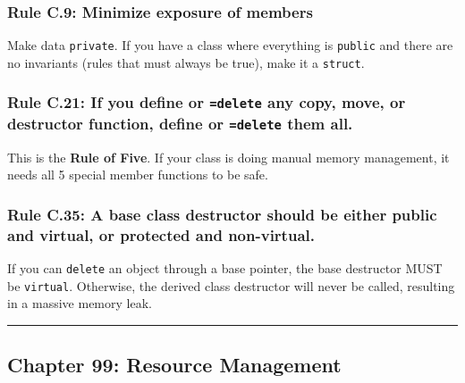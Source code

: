 \hypertarget{rule-c.9-minimize-exposure-of-members}{%
\subsubsection{Rule C.9: Minimize exposure of
members}\label{rule-c.9-minimize-exposure-of-members}}

Make data \passthrough{\lstinline!private!}. If you have a class where
everything is \passthrough{\lstinline!public!} and there are no
invariants (rules that must always be true), make it a
\passthrough{\lstinline!struct!}.

\hypertarget{rule-c.21-if-you-define-or-delete-any-copy-move-or-destructor-function-define-or-delete-them-all.}{%
\subsubsection{\texorpdfstring{Rule C.21: If you define or
\texttt{=delete} any copy, move, or destructor function, define or
\texttt{=delete} them
all.}{Rule C.21: If you define or =delete any copy, move, or destructor function, define or =delete them all.}}\label{rule-c.21-if-you-define-or-delete-any-copy-move-or-destructor-function-define-or-delete-them-all.}}

This is the \textbf{Rule of Five}. If your class is doing manual memory
management, it needs all 5 special member functions to be safe.

\hypertarget{rule-c.35-a-base-class-destructor-should-be-either-public-and-virtual-or-protected-and-non-virtual.}{%
\subsubsection{Rule C.35: A base class destructor should be either
public and virtual, or protected and
non-virtual.}\label{rule-c.35-a-base-class-destructor-should-be-either-public-and-virtual-or-protected-and-non-virtual.}}

If you can \passthrough{\lstinline!delete!} an object through a base
pointer, the base destructor MUST be \passthrough{\lstinline!virtual!}.
Otherwise, the derived class destructor will never be called, resulting
in a massive memory leak.

\begin{center}\rule{0.5\linewidth}{0.5pt}\end{center}

\hypertarget{chapter-99-resource-management}{%
\subsection{Chapter 99: Resource
Management}\label{chapter-99-resource-management}}

